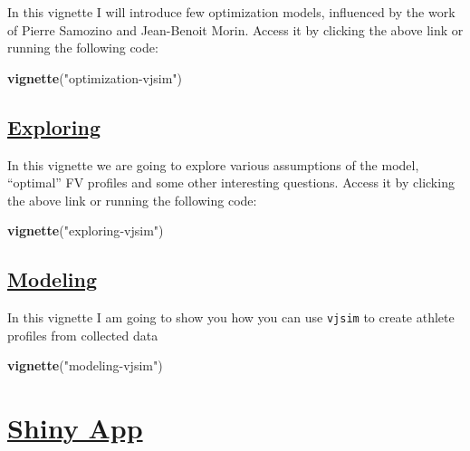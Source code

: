 \documentclass[
]{book}
\newenvironment{Shaded}{\begin{snugshade}}{\end{snugshade}}
\newcommand{\KeywordTok}[1]{\textcolor[rgb]{0.13,0.29,0.53}{\textbf{#1}}}
\newcommand{\NormalTok}[1]{#1}
\newcommand{\StringTok}[1]{\textcolor[rgb]{0.31,0.60,0.02}{#1}}
\begin{document}
In this vignette I will introduce few optimization models, influenced by the work of Pierre Samozino and Jean-Benoit Morin. Access it by clicking the above link or running the following code:

\begin{Shaded}
\begin{Highlighting}[]
\KeywordTok{vignette}\NormalTok{(}\StringTok{"optimization{-}vjsim"}\NormalTok{)}
\end{Highlighting}
\end{Shaded}

\hypertarget{exploring}{%
\subsection{\texorpdfstring{\href{https://mladenjovanovic.github.io/vjsim/articles/exploring-vjsim.html}{Exploring}}{Exploring}}\label{exploring}}

In this vignette we are going to explore various assumptions of the model, ``optimal'' FV profiles and some other interesting questions. Access it by clicking the above link or running the following code:

\begin{Shaded}
\begin{Highlighting}[]
\KeywordTok{vignette}\NormalTok{(}\StringTok{"exploring{-}vjsim"}\NormalTok{)}
\end{Highlighting}
\end{Shaded}

\hypertarget{modeling}{%
\subsection{\texorpdfstring{\href{https://mladenjovanovic.github.io/vjsim/articles/modeling-vjsim.html}{Modeling}}{Modeling}}\label{modeling}}

In this vignette I am going to show you how you can use \texttt{vjsim} to create athlete profiles from collected data

\begin{Shaded}
\begin{Highlighting}[]
\KeywordTok{vignette}\NormalTok{(}\StringTok{"modeling{-}vjsim"}\NormalTok{)}
\end{Highlighting}
\end{Shaded}

\hypertarget{shiny-app}{%
\section{\texorpdfstring{\href{https://athletess.shinyapps.io/shiny-simulator/}{Shiny App}}{Shiny App}}\label{shiny-app}}
\end{document}
